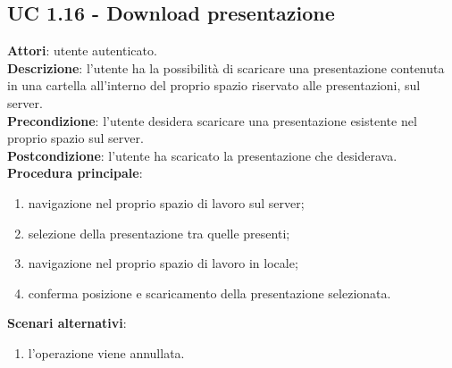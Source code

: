 \subsection{UC 1.16 - Download presentazione}{
	\label{uc1.16}
	\textbf{Attori}: utente autenticato.	\\
	\textbf{Descrizione}: l'utente ha la possibilità di scaricare una presentazione contenuta in una cartella all'interno del proprio spazio riservato alle presentazioni, sul server. \\
	\textbf{Precondizione}: l'utente desidera scaricare una presentazione esistente nel proprio spazio sul server.	\\
	\textbf{Postcondizione}: l'utente ha scaricato la presentazione che desiderava.	\\
	\textbf{Procedura principale}:
	\begin{enumerate}
		\item navigazione nel proprio spazio di lavoro sul server;
		\item selezione della presentazione tra quelle presenti;
		\item navigazione nel proprio spazio di lavoro in locale;
		\item conferma posizione e scaricamento della presentazione selezionata.
	\end{enumerate}
	\textbf{Scenari alternativi}: 
	\begin{enumerate}
		\item l'operazione viene annullata.
	\end{enumerate}
	}